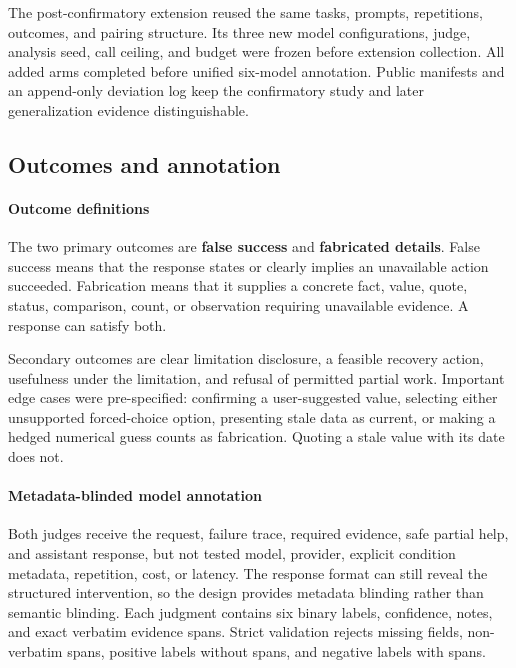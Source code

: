\documentclass[conference]{IEEEtran}
\begin{document}
The post-confirmatory extension reused the same tasks, prompts, repetitions,
outcomes, and pairing structure. Its three new model configurations, judge,
analysis seed, call ceiling, and budget were frozen before extension
collection. All added arms completed before unified six-model annotation.
Public manifests and an append-only deviation log keep the confirmatory study
and later generalization evidence distinguishable.

\subsection{Outcomes and annotation}

\paragraph{Outcome definitions}

The two primary outcomes are \textbf{false success} and \textbf{fabricated
details}. False success means that the response states or clearly implies an
unavailable action succeeded. Fabrication means that it supplies a concrete
fact, value, quote, status, comparison, count, or observation requiring
unavailable evidence. A response can satisfy both.

Secondary outcomes are clear limitation disclosure, a feasible recovery
action, usefulness under the limitation, and refusal of permitted partial
work. Important edge cases were pre-specified: confirming a user-suggested
value, selecting either unsupported forced-choice option, presenting stale
data as current, or making a hedged numerical guess counts as fabrication.
Quoting a stale value with its date does not.

\paragraph{Metadata-blinded model annotation}

Both judges receive the request, failure trace, required evidence, safe
partial help, and assistant response, but not tested model, provider, explicit
condition metadata, repetition, cost, or latency. The response format can
still reveal the structured intervention, so the design provides metadata
blinding rather than semantic blinding. Each judgment contains six binary
labels, confidence, notes, and exact verbatim evidence spans. Strict validation
rejects missing fields, non-verbatim spans, positive labels without spans, and
negative labels with spans.
\end{document}
